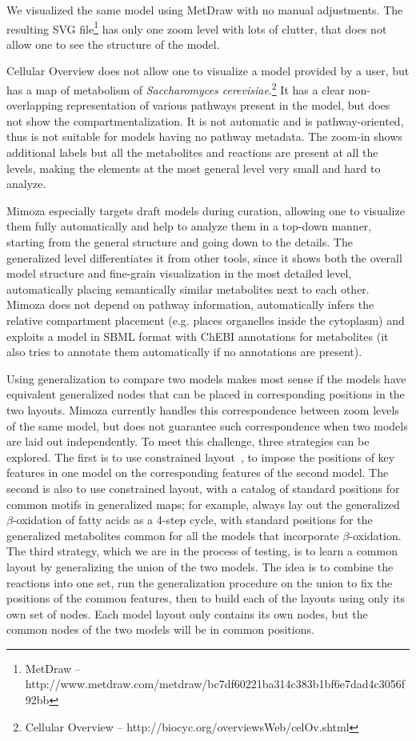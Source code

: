 \documentclass{bmcart}
\begin{document}
We visualized the same model using MetDraw with no manual adjustments. The resulting SVG file\footnote{MetDraw -- http://www.metdraw.com/metdraw/bc7df60221ba314c383b1bf6e7dad4c3056f92bb} has only one zoom level with lots of clutter, that does not allow one to see the structure of the model.

Cellular Overview does not allow one to visualize a model provided by a user, but has a map of metabolism of \emph{Saccharomyces cerevisiae}.\footnote{Cellular Overview -- http://biocyc.org/overviewsWeb/celOv.shtml} It has a clear non-overlapping representation of various pathways present in the model, but does not show the compartmentalization. It is not automatic and is pathway-oriented, thus is not suitable for models having no pathway metadata. The zoom-in shows additional labels but all the metabolites and reactions are present at all the levels, making the elements at the most general level very small and hard to analyze.

Mimoza especially targets draft models during curation, allowing one to visualize them fully automatically and help to analyze them in a top-down manner, starting from the general structure and going down to the details. The generalized level differentiates it from other tools, since it shows both the overall model structure and fine-grain visualization in the most detailed level, automatically placing semantically similar metabolites next to each other. Mimoza does not depend on pathway information, automatically infers the relative compartment placement (e.g. places organelles inside the cytoplasm) and exploits a model in SBML format with ChEBI annotations for metabolites (it also tries to annotate them automatically if no annotations are present).

Using generalization to compare two models makes most sense if the models have equivalent generalized nodes that can be placed in corresponding positions in the two layouts. Mimoza currently handles this correspondence between zoom levels of the same model, but does not guarantee such correspondence when two models are laid out independently.
To meet this challenge, three strategies can be explored.
The first is to use constrained layout~\cite{Karl-FriedrichBohringer}, to impose the positions of key features in one model on the corresponding features of the second model.
The second is also to use constrained layout, with a catalog of standard positions for common motifs in generalized maps; for example, always lay out the generalized $\beta$-oxidation of fatty acids as a 4-step cycle, with standard positions for the generalized metabolites common for all the models that incorporate $\beta$-oxidation.
The third strategy, which we are in the process of testing, is to learn a common layout by generalizing the union of the two models. The idea is to combine the reactions into one set, run the generalization procedure on the union to fix the positions of the common features, then to build each of the layouts using only its own set of nodes. Each model layout only contains its own nodes, but the common nodes of the two models will be in common positions.
\end{document}
